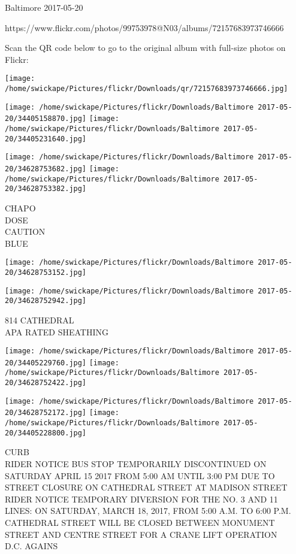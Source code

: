 \documentclass[10pt,letterpaper]{article}
\begin{document}
Baltimore 2017-05-20

https://www.flickr.com/photos/99753978@N03/albums/72157683973746666

Scan the QR code below to go to the original album with full-size photos on Flickr:

\texttt{[image: /home/swickape/Pictures/flickr/Downloads/qr/72157683973746666.jpg]}
\pagebreak

\texttt{[image: /home/swickape/Pictures/flickr/Downloads/Baltimore 2017-05-20/34405158870.jpg]}
\texttt{[image: /home/swickape/Pictures/flickr/Downloads/Baltimore 2017-05-20/34405231640.jpg]}

\texttt{[image: /home/swickape/Pictures/flickr/Downloads/Baltimore 2017-05-20/34628753682.jpg]}
\texttt{[image: /home/swickape/Pictures/flickr/Downloads/Baltimore 2017-05-20/34628753382.jpg]}

CHAPO\\
DOSE\\
CAUTION\\
BLUE
\pagebreak

\texttt{[image: /home/swickape/Pictures/flickr/Downloads/Baltimore 2017-05-20/34628753152.jpg]}

\vspace{0.25in}
\texttt{[image: /home/swickape/Pictures/flickr/Downloads/Baltimore 2017-05-20/34628752942.jpg]}

814 CATHEDRAL\\
APA RATED SHEATHING
\pagebreak

\texttt{[image: /home/swickape/Pictures/flickr/Downloads/Baltimore 2017-05-20/34405229760.jpg]}
\texttt{[image: /home/swickape/Pictures/flickr/Downloads/Baltimore 2017-05-20/34628752422.jpg]}

\texttt{[image: /home/swickape/Pictures/flickr/Downloads/Baltimore 2017-05-20/34628752172.jpg]}
\texttt{[image: /home/swickape/Pictures/flickr/Downloads/Baltimore 2017-05-20/34405228800.jpg]}

CURB\\
RIDER NOTICE BUS STOP TEMPORARILY DISCONTINUED ON SATURDAY APRIL 15 2017 FROM 5:00 AM UNTIL 3:00 PM DUE TO STREET CLOSURE ON CATHEDRAL STREET AT MADISON STREET\\
RIDER NOTICE TEMPORARY DIVERSION FOR THE NO. 3 AND 11 LINES: ON SATURDAY, MARCH 18, 2017, FROM 5:00 A.M. TO 6:00 P.M. CATHEDRAL STREET WILL BE CLOSED BETWEEN MONUMENT STREET AND CENTRE STREET FOR A CRANE LIFT OPERATION\\
D.C. AGAINS
\pagebreak
\end{document}
